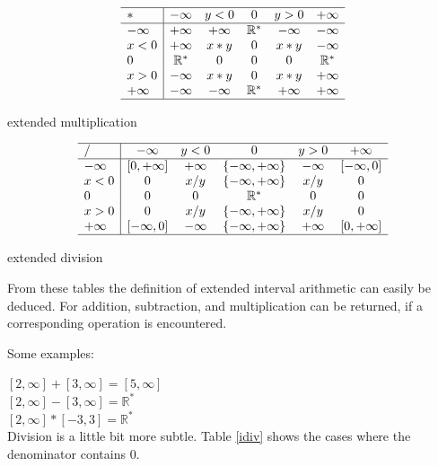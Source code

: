 \documentclass{report}
\newcommand{\Rs}{\mathbb{R}^*}
\begin{document}
\begin{center}
\begin{table}[!]
\[
\begin{array}{l|ccccc}
\hline
*&-\infty & y<0&0&y>0 &+\infty\\
\hline
-\infty  & +\infty & +\infty &\Rs& -\infty & -\infty\\
x <0  &   +\infty  & x*y   &0&x*y&     -\infty\\
0& \Rs & 0 &0 &0& \Rs\\ 
x >0  &   -\infty  & x*y   &0&x*y&     +\infty\\
+\infty & -\infty & -\infty& \Rs & +\infty & +\infty\\
\hline
\end{array}
\]
\caption{\label{mul}extended multiplication}
\end{table}
\end{center}

\begin{center}
\begin{table}[!]
\[
\begin{array}{l|ccccc}
\hline
/&-\infty & y<0&0&y>0 &+\infty\\
\hline
-\infty  & [0,+\infty] & +\infty & \{-\infty ,+\infty\}& -\infty & [-\infty,0]\\
x < 0  & 0&  x/y & \{-\infty ,+\infty\} &x/y&0\\
0& 0& 0  &\Rs &0 &0\\ 
x >0  &   0  & x/y   &\{-\infty, +\infty\}&x/y&     0\\
+\infty & [-\infty,0]& -\infty& \{-\infty ,+\infty\} & +\infty & [0,+\infty] \\
\hline 
\end{array}
\]
\caption{\label{div}extended division}
\end{table}
\end{center}

From these tables the definition of extended interval arithmetic can easily be
deduced. For addition, subtraction, and multiplication can be returned, if a
corresponding operation is encountered.

Some examples:

$[2, \infty] + [3,\infty] = [5, \infty]$\\
$[2, \infty] - [3,\infty] = \Rs$\\
$[2, \infty] * [-3,3] =\Rs$\\

Division is a little bit more subtle. Table \ref{idiv} shows the cases where
the denominator contains 0.
\end{document}
